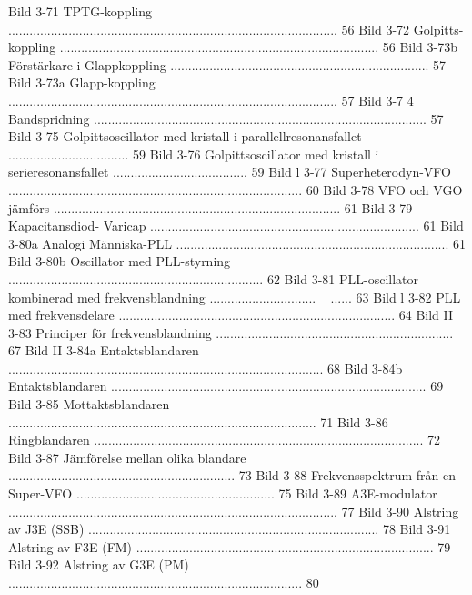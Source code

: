 Bild 3-71 TPTG-koppling ............................................................................................. 56
Bild 3-72 Golpitts-koppling .......................................................................................... 56
Bild 3-73b Förstärkare i Glappkoppling ......................................................................... 57
Bild 3-73a Glapp-koppling ............................................................................................. 57
Bild 3-7 4 Bandspridning .............................................................................................. 57
Bild 3-75 Golpittsoscillator med kristall i parallellresonansfallet .................................. 59
Bild 3-76 Golpittsoscillator med kristall i serieresonansfallet ...................................... 59
Bild l 3-77 Superheterodyn-VFO ................................................................................... 60
Bild 3-78 VFO och VGO jämförs ................................................................................. 61
Bild 3-79 Kapacitansdiod- Varicap ............................................................................ 61
Bild 3-80a Analogi Människa-PLL ............................................................................. 61
Bild 3-80b Oscillator med PLL-styrning ........................................................................ 62
Bild 3-81 PLL-oscillator kombinerad med frekvensblandning .............................. ~ ...... 63
Bild l 3-82 PLL med frekvensdelare .............................................................................. 64
Bild II 3-83 Principer för frekvensblandning ................................................................... 67
Bild II 3-84a Entaktsblandaren ......................................................................................... 68
Bild 3-84b Entaktsblandaren ......................................................................................... 69
Bild 3-85 Mottaktsblandaren ....................................................................................... 71
Bild 3-86 Ringblandaren ............................................................................................. 72
Bild 3-87 Jämförelse mellan olika blandare ................................................................ 73
Bild 3-88 Frekvensspektrum från en Super-VFO ........................................................ 75
Bild 3-89 A3E-modulator ............................................................................................. 77
Bild 3-90 Alstring av J3E (SSB) .................................................................................. 78
Bild 3-91 Alstring av F3E (FM) .................................................................................... 79
Bild 3-92 Alstring av G3E (PM) ................................................................................... 80

